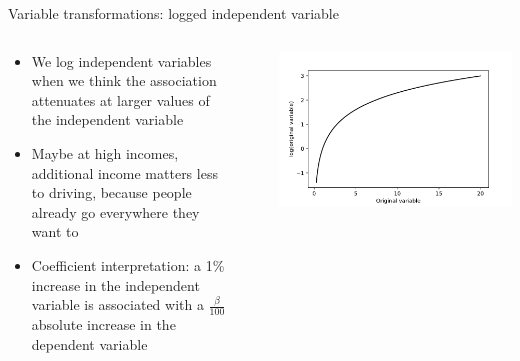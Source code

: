 \begin{frame}{Variable transformations: logged independent variable}
  \begin{columns}
    \begin{column}{0.65\textwidth}
      \begin{itemize}
        \item We log independent variables when we think the association attenuates at larger values of the independent variable
        \item Maybe at high incomes, additional income matters less to driving, because people already go everywhere they want to
        \item Coefficient interpretation: a 1\% increase in the independent variable is associated with a $\frac{\beta}{100}$ absolute increase in the dependent variable \autocite{ford_interpreting_2018}
      \end{itemize}
    \end{column}~%
    \begin{column}{0.34\textwidth}
      \includegraphics[width=\textwidth]{fig/log.pdf}
    \end{column}
  \end{columns}
\end{frame}

